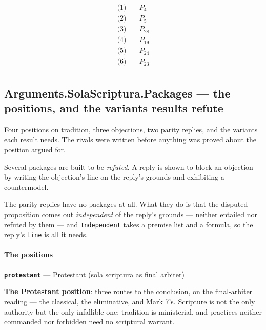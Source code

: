 \documentclass[11pt]{article}
\begin{document}
\begin{align*}
  \text{(1)} \quad & P_{4} \\
  \text{(2)} \quad & P_{5} \\
  \text{(3)} \quad & P_{28} \\
  \text{(4)} \quad & P_{19} \\
  \text{(5)} \quad & P_{24} \\
  \text{(6)} \quad & P_{23} \\
\end{align*}
\subsection*{Arguments.SolaScriptura.Packages — the positions, and the variants results refute}
Four positions on tradition, three objections, two parity replies, and the variants each result needs. The rivals were written before anything was proved about the position argued for.

Several packages are built to be \emph{refuted}. A reply is shown to block an objection by writing the objection's line on the reply's grounds and exhibiting a countermodel.

The parity replies have no packages at all. What they do is that the disputed proposition comes out \emph{independent} of the reply's grounds — neither entailed nor refuted by them — and \texttt{Independent} takes a premise list and a formula, so the reply's \texttt{Line} is all it needs.

\paragraph*{The positions}
\leavevmode\par
\par\medskip\noindent\textbf{\texttt{protestant}} --- Protestant (sola scriptura as final arbiter)\par\nobreak\noindent
\textbf{The Protestant position}: three routes to the conclusion, on the final-arbiter reading — the classical, the eliminative, and Mark 7's. Scripture is not the only authority but the only infallible one; tradition is ministerial, and practices neither commanded nor forbidden need no scriptural warrant.
\end{document}
